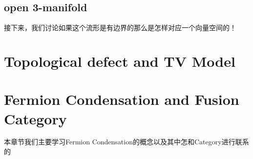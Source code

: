 \subsection{open 3-manifold}

接下来，我们讨论如果这个流形是有边界的那么是怎样对应一个向量空间的！










\section{Topological defect and TV
 Model}



\section{Fermion Condensation and Fusion Category}
本章节我们主要学习Fermion Condensation的概念以及其中怎和Category进行联系的